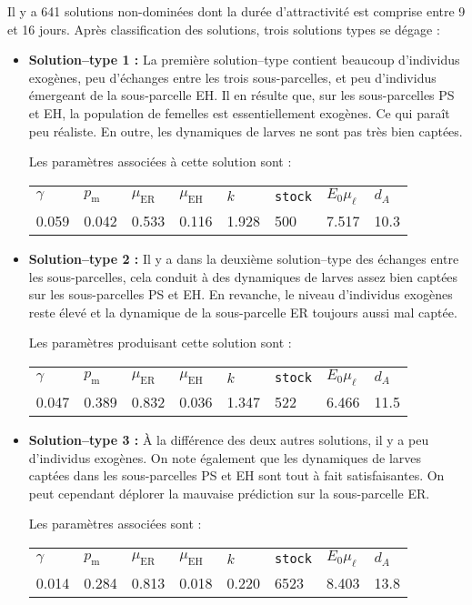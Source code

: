 Il y a 641 solutions non-dominées dont la durée d'attractivité est comprise entre 9 et 16 jours.
Après classification des solutions, trois solutions types se dégage :
\begin{itemize}
 \item \textbf{Solution--type 1 :} La première solution--type contient beaucoup d'individus exogènes, peu d'échanges entre les trois sous-parcelles, et peu d'individus émergeant de la sous-parcelle EH.
 Il en résulte que, sur les sous-parcelles PS et EH, la population de femelles est essentiellement exogènes. Ce qui paraît peu réaliste.
 En outre, les dynamiques de larves ne sont pas très bien captées.

 Les paramètres associées à cette solution sont :
 \begin{center}
\begin{tabular}{llllllll}
$\gamma$ & $p_{\text{m}}$ & $\mu_{\text{ER}}$ & $\mu_{\text{EH}}$ & $k$ & \texttt{stock} & $E_0\mu_\ell$ & $d_A$\\
0.059 & 0.042 & 0.533 & 0.116 & 1.928 & 500 & 7.517 & 10.3
 \end{tabular}
 \end{center}

 \item \textbf{Solution--type 2 :} Il y a dans la deuxième solution--type des échanges entre les sous-parcelles, cela conduit à des dynamiques de larves assez bien captées sur les sous-parcelles PS et EH.
 En revanche, le niveau d'individus exogènes reste élevé et la dynamique de la sous-parcelle ER toujours aussi mal captée.
 
 Les paramètres produisant cette solution sont :
  \begin{center}
\begin{tabular}{llllllll}
$\gamma$ & $p_{\text{m}}$ & $\mu_{\text{ER}}$ & $\mu_{\text{EH}}$ & $k$ & \texttt{stock} & $E_0\mu_\ell$ & $d_A$\\
0.047 & 0.389 & 0.832 & 0.036 & 1.347 & 522 & 6.466 & 11.5
 \end{tabular}
 \end{center}
 
 \item \textbf{Solution--type 3 :} À la différence des deux autres solutions, il y a peu d'individus exogènes. On note également que les dynamiques de larves captées dans les sous-parcelles PS et EH sont tout à fait satisfaisantes.
 On peut cependant déplorer la mauvaise prédiction sur la sous-parcelle ER.
 
 Les paramètres associées sont :
   \begin{center}
\begin{tabular}{llllllll}
$\gamma$ & $p_{\text{m}}$ & $\mu_{\text{ER}}$ & $\mu_{\text{EH}}$ & $k$ & \texttt{stock} & $E_0\mu_\ell$ & $d_A$\\
0.014 & 0.284 & 0.813 & 0.018 & 0.220 & 6523 & 8.403 & 13.8
 \end{tabular}
 \end{center}
 
\end{itemize}

